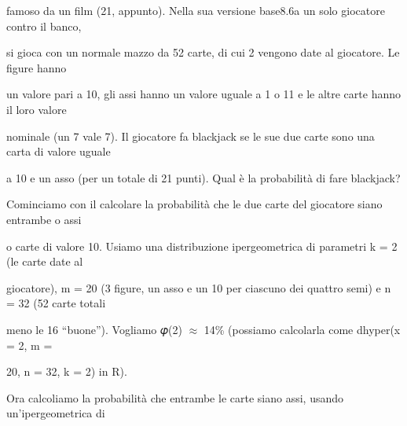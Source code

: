\documentclass[a4paper,portrait,12pt]{article}
\begin{document}
\begin{flushleft}
famoso da un film (21, appunto). Nella sua versione base8.6a un solo giocatore contro il banco,
\end{flushleft}


\begin{flushleft}
si gioca con un normale mazzo da 52 carte, di cui 2 vengono date al giocatore. Le figure hanno
\end{flushleft}


\begin{flushleft}
un valore pari a 10, gli assi hanno un valore uguale a 1 o 11 e le altre carte hanno il loro valore
\end{flushleft}


\begin{flushleft}
nominale (un 7 vale 7). Il giocatore fa blackjack se le sue due carte sono una carta di valore uguale
\end{flushleft}


\begin{flushleft}
a 10 e un asso (per un totale di 21 punti). Qual \`{e} la probabilit\`{a} di fare blackjack?
\end{flushleft}


\begin{flushleft}
Cominciamo con il calcolare la probabilit\`{a} che le due carte del giocatore siano entrambe o assi
\end{flushleft}


\begin{flushleft}
o carte di valore 10. Usiamo una distribuzione ipergeometrica di parametri k = 2 (le carte date al
\end{flushleft}


\begin{flushleft}
giocatore), m = 20 (3 figure, un asso e un 10 per ciascuno dei quattro semi) e n = 32 (52 carte totali
\end{flushleft}


\begin{flushleft}
meno le 16 {``}buone''). Vogliamo 𝜑(2) $\approx$ 14\% (possiamo calcolarla come dhyper(x = 2, m =
\end{flushleft}


\begin{flushleft}
20, n = 32, k = 2) in R).
\end{flushleft}


\begin{flushleft}
Ora calcoliamo la probabilit\`{a} che entrambe le carte siano assi, usando un'ipergeometrica di
\end{flushleft}
\end{document}
